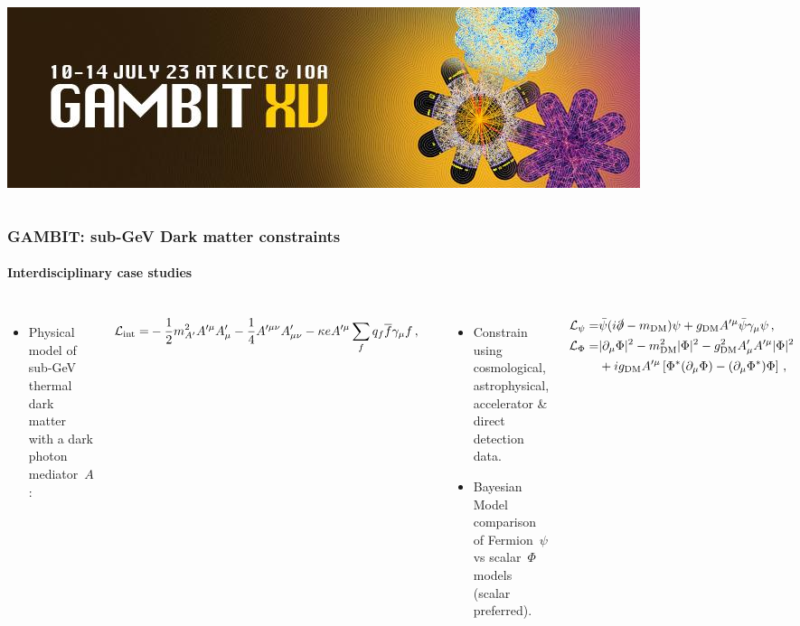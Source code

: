 \documentclass[aspectratio=169, handout]{beamer}
\begin{document}
\begin{frame}
\begin{columns}
        \includegraphics[width=\textwidth]{figures/gambit_meetingbanner.jpg}
    \end{columns}
\end{frame}

\begin{frame}
    \frametitle{GAMBIT: sub-GeV Dark matter constraints}
    \framesubtitle{Interdisciplinary case studies}
    \begin{columns}
        \begin{itemize}
            \item Physical model of sub-GeV thermal dark matter with a dark photon mediator~$A$:
        \end{itemize}
        \vspace{-10pt}
        \begin{align*}
            \small
            \mathcal{L}_\text{int} =& -\frac{1}{2} m_{A'}^2 A'^\mu A'_\mu - \frac{1}{4} A'^{\mu\nu}A'_{\mu\nu} -\kappa e A'^\mu \sum_{f} q_f \overline{f} \gamma_\mu f \,,
            \normalsize
        \end{align*}
        \vspace{-15pt}
        \begin{itemize}
            \item Constrain using cosmological, astrophysical, accelerator \& direct detection data.
            \item Bayesian Model comparison of Fermion~$\psi$ vs scalar~$\Phi$ models (scalar preferred).
        \end{itemize}
        \vspace{-10pt}
        \begin{align*}
            \small
            \mathcal{L}_\psi  =& \bar{\psi}(i \slashed{\partial} - m_\text{DM}) \psi + g_\text{DM} A'^\mu \bar{\psi} \gamma_\mu \psi \,,\\
            \mathcal{L}_\Phi  =& |\partial_\mu \Phi|^2 - m_\text{DM}^2 |\Phi|^2 - g_\text{DM}^2 A'_\mu A'^\mu |\Phi|^2 \\ &+ i g_\text{DM} A'^\mu \left[\Phi^\ast (\partial_\mu \Phi) - (\partial_\mu \Phi^\ast) \Phi\right]\,,

\end{align*}
\end{columns}
\end{frame}
\end{document}
